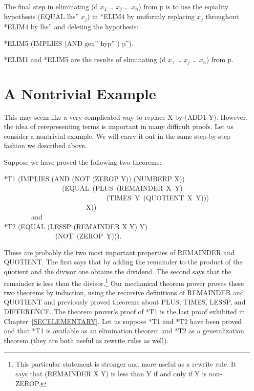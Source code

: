 \documentclass[10pt]{book}
\newenvironment{pubasis}{\begin{flushleft}}{\end{flushleft}}
\begin{document}
The final step in eliminating (d $x_{1}$ \ldots{} $x_{j}$ \ldots{} $x_{n}$)
from p is to use the equality hypothesis (EQUAL lhs'' $x_{j}$)
in *ELIM4 by uniformly replacing $x_{j}$  throughout *ELIM4 by lhs'' 
and deleting the hypothesis:
\begin{pubasis}
*ELIM5	(IMPLIES (AND gen'' hyp''') p'').\\
\end{pubasis}
*ELIM1 and *ELIM5 are the results of eliminating (d $x_{1}$ \ldots{} $x_{j}$ \ldots{} $x_{n}$) from p.

\section{A Nontrivial Example}
This may seem like a very complicated way to replace X by (ADD1 Y).
However, the idea of rerepresenting terms is important in many
difficult proofs.  Let us consider a nontrivial example.  We will
carry it out in the same step-by-step fashion we described above.

Suppose we have proved the following two theorems:

\begin{pubasis}
*T1	(IMPLIES (AND (NOT (ZEROP Y)) (NUMBERP X))\\
~~~~~~~~~~~~~~~~~(EQUAL~(PLUS~(REMAINDER~X~Y)\\
~~~~~~~~~~~~~~~~~~~~~~~~~~~~~~(TIMES~Y~(QUOTIENT~X~Y)))\\
~~~~~~~~~~~~~~~~~~~~~~~~X))\\

~~~~~~~~and\\

*T2     (EQUAL (LESSP (REMAINDER X Y) Y)\\
~~~~~~~~~~~~~~~(NOT~(ZEROP~Y))).\\
\end{pubasis}
These are probably the two most important properties of REMAINDER
and QUOTIENT.  The first says that by adding the remainder to the
product of the quotient and the divisor one obtains the dividend.
The second says that the remainder is less than the divisor.\footnote{This particular statement is stronger and  more useful as a rewrite rule.  It says that (REMAINDER X Y) is less than Y if and only if Y is non-ZEROP.}
Our mechanical theorem prover proves these two theorems by induction,
using the recursive definitions of REMAINDER and QUOTIENT and
previously proved theorems about PLUS, TIMES, LESSP, and DIFFERENCE.
The theorem prover's proof of *T1 is the last proof exhibited in
Chapter~\ref{SECELEMENTARY}.  Let
us suppose *T1 and *T2 have been proved and that
*T1 is available as an elimination theorem and *T2
as a generalization theorem (they are both useful as rewrite rules as well).
\end{document}
